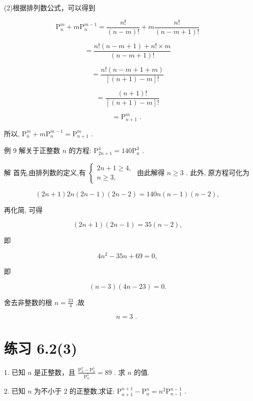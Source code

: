 \documentclass[10pt]{article}
\begin{document}
(2)根据排列数公式，可以得到

\[
{\mathrm{P}}_{n}^{m} + m{\mathrm{P}}_{n}^{m - 1} = \frac{n!}{\left( {n - m}\right) !} + m\frac{n!}{\left( {n - m + 1}\right) !}
\]

\[
= \frac{n!\left( {n - m + 1}\right)  + n! \times  m}{\left( {n - m + 1}\right) !}
\]

\[
= \frac{n!\left( {n - m + 1 + m}\right) }{\left\lbrack  {\left( {n + 1}\right)  - m}\right\rbrack  !}
\]





\[
= \frac{\left( {n + 1}\right) !}{\left\lbrack  {\left( {n + 1}\right)  - m}\right\rbrack  !}
\]

\[
= {\mathrm{P}}_{n + 1}^{m}\text{ . }
\]

所以, \({\mathrm{P}}_{n}^{m} + m{\mathrm{P}}_{n}^{m - 1} = {\mathrm{P}}_{n + 1}^{m}\) .

例 9 解关于正整数 \(n\) 的方程: \({\mathrm{P}}_{{2n} + 1}^{4} = {140}{\mathrm{P}}_{n}^{3}\) .

解 首先,由排列数的定义,有 \(\left\{  \begin{array}{l} {2n} + 1 \geq  4, \\  n \geq  3, \end{array}\right.\) 由此解得 \(n \geq  3\) . 此外, 原方程可化为

\[
\left( {{2n} + 1}\right) {2n}\left( {{2n} - 1}\right) \left( {{2n} - 2}\right)  = {140n}\left( {n - 1}\right) \left( {n - 2}\right) ,
\]

再化简, 可得

\[
\left( {{2n} + 1}\right) \left( {{2n} - 1}\right)  = {35}\left( {n - 2}\right) ,
\]

即

\[
4{n}^{2} - {35n} + {69} = 0,
\]

即

\[
\left( {n - 3}\right) \left( {{4n} - {23}}\right)  = 0.
\]

舍去非整数的根 \(n = \frac{23}{4}\) ,故

\[
n = 3\text{ . }
\]

\section*{练习 6.2(3)}

1. 已知 \(n\) 是正整数，且 \(\frac{{\mathrm{P}}_{n}^{7} - {\mathrm{P}}_{n}^{5}}{{\mathrm{P}}_{n}^{5}} = {89}\) . 求 \(n\) 的值.

2. 已知 \(n\) 为不小于 2 的正整数,求证: \({\mathrm{P}}_{n + 1}^{n + 1} - {\mathrm{P}}_{n}^{n} = {n}^{2}{\mathrm{P}}_{n - 1}^{n - 1}\) .
\end{document}
